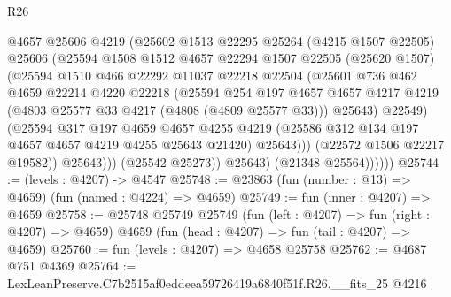 \begin{lexlean}{R26}
\begin{coremodule}
                        @4657
                        @25606
                        @4219
                        (@25602
                          @1513
                          @22295
                          @25264
                          (@4215 @1507 @22505)
                          @25606
                          (@25594
                            @1508
                            @1512
                            @4657
                            @22294
                            @1507
                            @22505
                            (@25620 @1507)
                            (@25594
                              @1510
                              @466
                              @22292
                              @11037
                              @22218
                              @22504
                              (@25601
                                @736
                                @462
                                @4659
                                @22214
                                @4220
                                @22218
                                (@25594
                                  @254
                                  @197
                                  @4657
                                  @4657
                                  @4217
                                  @4219
                                  (@4803 @25577 @33 @4217 (@4808 (@4809 @25577 @33)))
                                  @25643)
                                @22549)
                              (@25594
                                @317
                                @197
                                @4659
                                @4657
                                @4255
                                @4219
                                (@25586 @312 @134 @197 @4657 @4657 @4219 @4255 @25643 @21420)
                                @25643)))
                          (@22572 @1506 @22217 @19582))
                        @25643)))
                  (@25542 @25273))
                @25643)
              (@21348 @25564))))))
@25744 := (levels : @4207) -> @4547
@25748 := @23863 (fun (number : @13) => @4659) (fun (named : @4224) => @4659)
@25749 := fun (inner : @4207) => @4659
@25758 := @25748
    @25749
    @25749
    (fun (left : @4207) => fun (right : @4207) => @4659)
    @4659
    (fun (head : @4207) => fun (tail : @4207) => @4659)
@25760 := fun (levels : @4207) => @4658 @25758
@25762 := @4687 @751 @4369
@25764 := LexLeanPreserve.C7b2515af0eddeea59726419a6840f51f.R26.__fits_25 @4216

\end{coremodule}
\end{lexlean}
